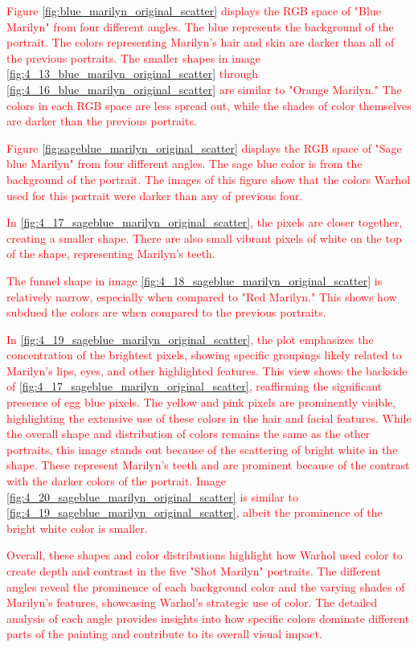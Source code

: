 \documentclass{article}
\begin{document}
\textcolor{red}{Figure \ref{fig:blue_marilyn_original_scatter} displays the RGB space of "Blue Marilyn" from four different
angles. The blue represents the background of the portrait. The colors
representing Marilyn's hair and skin are darker than all of the previous
portraits. The smaller shapes in image \ref{fig:4_13_blue_marilyn_original_scatter} through \ref{fig:4_16_blue_marilyn_original_scatter} are similar to
"Orange Marilyn." The colors in each RGB space are less spread out,
while the shades of color themselves are darker than the previous
portraits.}



\textcolor{red}{Figure \ref{fig:sageblue_marilyn_original_scatter} displays the RGB space of "Sage blue Marilyn" from four
different angles. The sage blue color is from the background of the
portrait. The images of this figure show that the colors Warhol used for
this portrait were darker than any of previous four.}

\textcolor{red}{In \ref{fig:4_17_sageblue_marilyn_original_scatter}, the pixels are closer together, creating a smaller shape. There
are also small vibrant pixels of white on the top of the shape,
representing Marilyn's teeth.}

\textcolor{red}{The funnel shape in image \ref{fig:4_18_sageblue_marilyn_original_scatter} is relatively narrow, especially when
compared to "Red Marilyn." This shows how subdued the colors are when
compared to the previous portraits.}

\textcolor{red}{In \ref{fig:4_19_sageblue_marilyn_original_scatter}, the plot emphasizes the concentration of the brightest pixels,
showing specific groupings likely related to Marilyn's lips, eyes, and
other highlighted features. This view shows the backside of \ref{fig:4_17_sageblue_marilyn_original_scatter},
reaffirming the significant presence of egg blue pixels. The yellow and
pink pixels are prominently visible, highlighting the extensive use of
these colors in the hair and facial features. While the overall shape
and distribution of colors remains the same as the other portraits, this
image stands out because of the scattering of bright white in the shape.
These represent Marilyn's teeth and are prominent because of the
contrast with the darker colors of the portrait. Image \ref{fig:4_20_sageblue_marilyn_original_scatter} is similar to
\ref{fig:4_19_sageblue_marilyn_original_scatter}, albeit the prominence of the bright white color is smaller.}

\textcolor{red}{Overall, these shapes and color distributions highlight how Warhol used
color to create depth and contrast in the five "Shot Marilyn"
portraits. The different angles reveal the prominence of each background
color and the varying shades of Marilyn's features, showcasing Warhol's
strategic use of color. The detailed analysis of each angle provides
insights into how specific colors dominate different parts of the
painting and contribute to its overall visual impact.}
\end{document}
